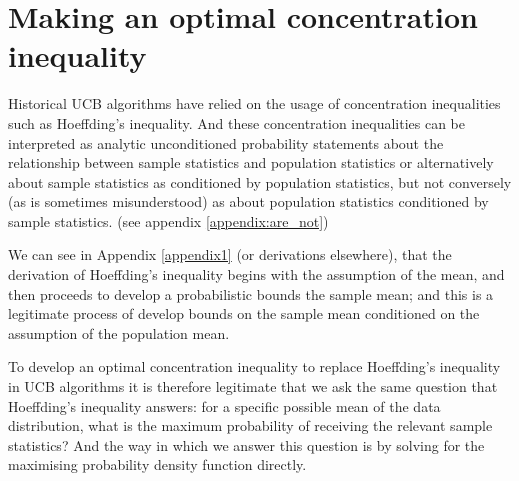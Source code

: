 \documentclass[12pt]{colt2020} %
\begin{document}
%
%



\section{Making an optimal concentration inequality}\label{sec:on_probability}

Historical UCB algorithms have relied on the usage of concentration inequalities such as Hoeffding's inequality.
And these concentration inequalities can be interpreted as analytic unconditioned probability statements about the relationship between sample statistics and population statistics or alternatively about sample statistics as conditioned by population statistics, but not conversely (as is sometimes misunderstood) as about population statistics conditioned by sample statistics. (see appendix \ref{appendix:are_not})

We can see in Appendix \ref{appendix1} (or derivations elsewhere), that the derivation of Hoeffding's inequality begins with the assumption of the mean, and then proceeds to develop a probabilistic bounds the sample mean; and this is a legitimate process of develop bounds on the sample mean conditioned on the assumption of the population mean.

To develop an optimal concentration inequality to replace Hoeffding's inequality in UCB algorithms it is therefore legitimate that we ask the same question that Hoeffding's inequality answers: for a specific possible mean of the data distribution, what is the maximum probability of receiving the relevant sample statistics? And the way in which we answer this question is by solving for the maximising probability density function directly.
\end{document}
